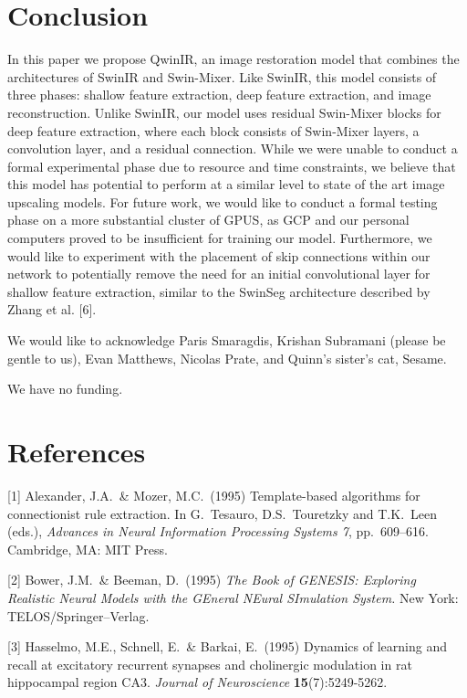 \documentclass{article}
\begin{document}
\section{Conclusion}

In this paper we propose QwinIR, an image restoration model that combines the architectures of SwinIR and Swin-Mixer. Like SwinIR, this model consists of three phases: shallow feature extraction, deep feature extraction, and image reconstruction. Unlike SwinIR, our model uses residual Swin-Mixer blocks for deep feature extraction, where each block consists of Swin-Mixer layers, a convolution layer, and a residual connection. While we were unable to conduct a formal experimental phase due to resource and time constraints, we believe that this model has potential to perform at a similar level to state of the art image upscaling models. For future work, we would like to conduct a formal testing phase on a more substantial cluster of GPUS, as GCP and our personal computers proved to be insufficient for training our model. Furthermore, we would like to experiment with the placement of skip connections within our network to potentially remove the need for an initial convolutional layer for shallow feature extraction, similar to the SwinSeg architecture described by Zhang et al. [6].

\begin{ack}
    We would like to acknowledge Paris Smaragdis, Krishan Subramani (please be gentle to us), Evan Matthews, Nicolas Prate, and Quinn’s sister’s cat, Sesame.
    
    We have no funding.
\end{ack}
\section*{References}

 [1] Alexander, J.A.\ \& Mozer, M.C.\ (1995) Template-based algorithms for
connectionist rule extraction. In G.\ Tesauro, D.S.\ Touretzky and T.K.\ Leen
(eds.), {\it Advances in Neural Information Processing Systems 7},
pp.\ 609--616. Cambridge, MA: MIT Press.


    [2] Bower, J.M.\ \& Beeman, D.\ (1995) {\it The Book of GENESIS: Exploring
        Realistic Neural Models with the GEneral NEural SImulation System.}  New York:
TELOS/Springer--Verlag.


[3] Hasselmo, M.E., Schnell, E.\ \& Barkai, E.\ (1995) Dynamics of learning and
recall at excitatory recurrent synapses and cholinergic modulation in rat
hippocampal region CA3. {\it Journal of Neuroscience} {\bf 15}(7):5249-5262.
\end{document}
